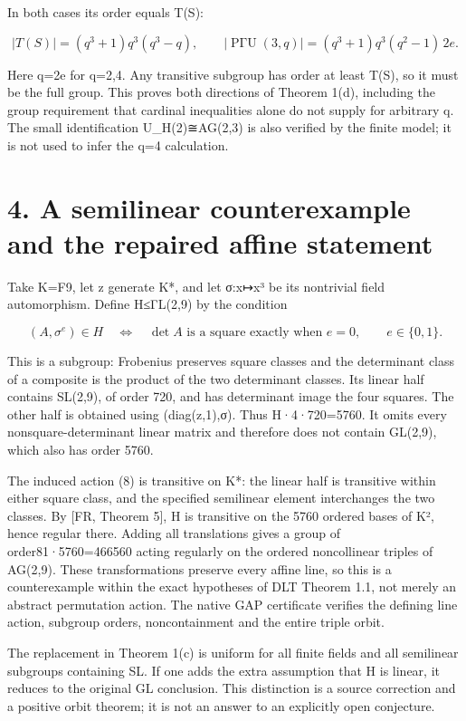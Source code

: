 \documentclass[
  11pt,
  a4paper,
]{article}
\begin{document}
In both cases its order equals \textbar T(S)\textbar:

\[
 |T(S)|=(q^3+1)q^3(q^3-q),\qquad
 |\operatorname{P\Gamma U}(3,q)|=(q^3+1)q^3(q^2-1)\,2e.
\]

Here q=2e for q=2,4. Any transitive subgroup has order at least
\textbar T(S)\textbar, so it must be the full group. This proves both
directions of Theorem 1(d), including the group requirement that
cardinal inequalities alone do not supply for arbitrary q. The small
identification U\_H(2)≅AG(2,3) is also verified by the finite model; it
is not used to infer the q=4 calculation.

\section{4. A semilinear counterexample and the repaired affine
statement}\label{a-semilinear-counterexample-and-the-repaired-affine-statement}

Take K=F9, let z generate K*, and let σ:x↦x³ be its nontrivial field
automorphism. Define H≤ΓL(2,9) by the condition

\[
 (A,\sigma^e)\in H\quad\Longleftrightarrow\quad
 \det A\text{ is a square exactly when }e=0,
 \qquad e\in\{0,1\}.
\tag{10}
\]

This is a subgroup: Frobenius preserves square classes and the
determinant class of a composite is the product of the two determinant
classes. Its linear half contains SL(2,9), of order 720, and has
determinant image the four squares. The other half is obtained using
(diag(z,1),σ). Thus \textbar H·4·720=5760. It omits every
nonsquare-determinant linear matrix and therefore does not contain
GL(2,9), which also has order 5760.

The induced action (8) is transitive on K*: the linear half is
transitive within either square class, and the specified semilinear
element interchanges the two classes. By {[}FR, Theorem 5{]}, H is
transitive on the 5760 ordered bases of K², hence regular there. Adding
all translations gives a group of order81·5760=466560 acting regularly
on the ordered noncollinear triples of AG(2,9). These transformations
preserve every affine line, so this is a counterexample within the exact
hypotheses of DLT Theorem 1.1, not merely an abstract permutation
action. The native GAP certificate verifies the defining line action,
subgroup orders, noncontainment and the entire triple orbit.

The replacement in Theorem 1(c) is uniform for all finite fields and all
semilinear subgroups containing SL. If one adds the extra assumption
that H is linear, it reduces to the original GL conclusion. This
distinction is a source correction and a positive orbit theorem; it is
not an answer to an explicitly open conjecture.
\end{document}
